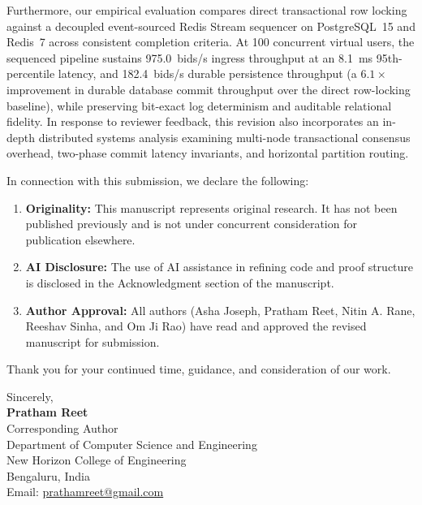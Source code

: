 \documentclass[11pt]{article}
\begin{document}
\noindent Furthermore, our empirical evaluation compares direct transactional row locking against a decoupled event-sourced Redis Stream sequencer on PostgreSQL~15 and Redis~7 across consistent completion criteria. At 100 concurrent virtual users, the sequenced pipeline sustains 975.0~bids/s ingress throughput at an 8.1~ms 95th-percentile latency, and 182.4~bids/s durable persistence throughput (a $6.1\times$ improvement in durable database commit throughput over the direct row-locking baseline), while preserving bit-exact log determinism and auditable relational fidelity. In response to reviewer feedback, this revision also incorporates an in-depth distributed systems analysis examining multi-node transactional consensus overhead, two-phase commit latency invariants, and horizontal partition routing.

\vspace{0.5em}

\noindent In connection with this submission, we declare the following:
\begin{enumerate}
    \item \textbf{Originality:} This manuscript represents original research. It has not been published previously and is not under concurrent consideration for publication elsewhere.
    \item \textbf{AI Disclosure:} The use of AI assistance in refining code and proof structure is disclosed in the Acknowledgment section of the manuscript.
    \item \textbf{Author Approval:} All authors (Asha Joseph, Pratham Reet, Nitin A. Rane, Reeshav Sinha, and Om Ji Rao) have read and approved the revised manuscript for submission.
\end{enumerate}

\vspace{0.8em}

\noindent Thank you for your continued time, guidance, and consideration of our work.

\vspace{1.2em}

\begin{flushleft}
    Sincerely, \\
    \vspace{1.5em}
    \textbf{Pratham Reet} \\
    Corresponding Author \\
    Department of Computer Science and Engineering \\
    New Horizon College of Engineering \\
    Bengaluru, India \\
    Email: \href{mailto:prathamreet@gmail.com}{prathamreet@gmail.com}
\end{flushleft}
\end{document}
